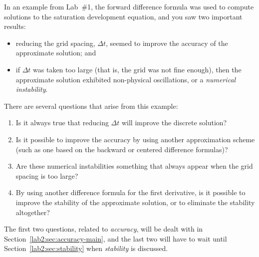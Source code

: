In an example from Lab~\#1, the
forward difference formula was used to compute solutions to the
saturation development equation, and
you saw two important results:
\begin{itemize}
\item reducing the grid spacing, $\Delta t$, seemed to improve the
  accuracy of the approximate solution; and  
\item if $\Delta t$ was taken too large (that is, the grid was not
  fine enough), then the approximate solution exhibited non-physical
  oscillations, or a \emph{  numerical instability}.
\end{itemize}
There are several questions that arise from this example:
\begin{enumerate}
\item Is it always true that reducing $\Delta t$ will improve the
  discrete solution?
\item Is it possible to improve the accuracy by using another
  approximation scheme (such as one based on the backward or centered
  difference formulas)? 
\item Are these numerical instabilities something that always appear
  when the grid spacing is too large?  
\item By using another difference formula for the first
  derivative, is it possible to improve the stability of the
  approximate solution, or to eliminate the stability altogether?
\end{enumerate}
The first two questions, related to \emph{ accuracy}, will be dealt
with in Section~\ref{lab2:sec:accuracy-main}, and the last two will have to
wait until Section~\ref{lab2:sec:stability} when \emph{ stability} is
discussed.


